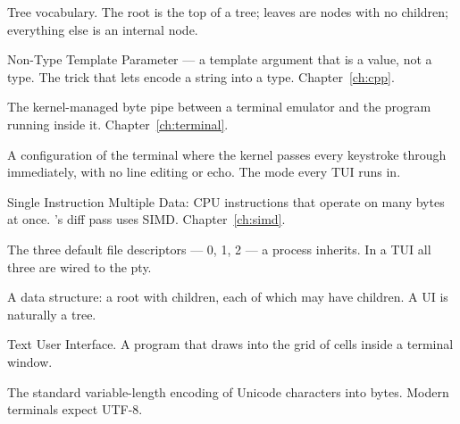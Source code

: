 \begin{description}[leftmargin=*, style=nextline]
  \item[\textbf{Leaf, node, root}] Tree vocabulary. The root is the
    top of a tree; leaves are nodes with no children; everything
    else is an internal node.
  \item[\textbf{NTTP}] Non-Type Template Parameter --- a template
    argument that is a value, not a type. The trick that lets
     encode a string into a type.
    Chapter~\ref{ch:cpp}.
  \item[\textbf{Pseudo-terminal, pty}] The kernel-managed byte pipe
    between a terminal emulator and the program running inside it.
    Chapter~\ref{ch:terminal}.
  \item[\textbf{Raw mode}] A configuration of the terminal where the
    kernel passes every keystroke through immediately, with no line
    editing or echo. The mode every TUI runs in.
  \item[\textbf{SIMD}] Single Instruction Multiple Data: CPU
    instructions that operate on many bytes at once. \maya{}'s diff
    pass uses SIMD. Chapter~\ref{ch:simd}.
  \item[\textbf{stdin / stdout / stderr}] The three default file
    descriptors --- 0, 1, 2 --- a process inherits. In a TUI all
    three are wired to the pty.
  \item[\textbf{Tree}] A data structure: a root with children, each
    of which may have children. A UI is naturally a tree.
  \item[\textbf{TUI}] Text User Interface. A program that draws
    into the grid of cells inside a terminal window.
  \item[\textbf{UTF-8}] The standard variable-length encoding of
    Unicode characters into bytes. Modern terminals expect UTF-8.
\end{description}
